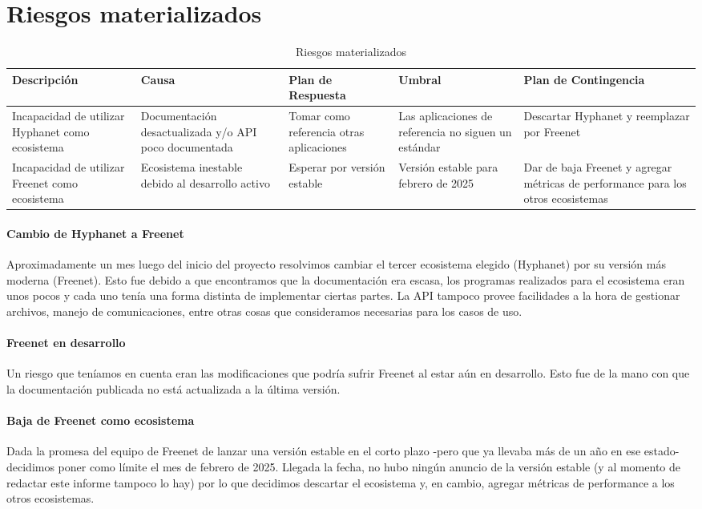 \section{Riesgos materializados}

\setlength\tabcolsep{3pt}
\begin{table}[!htbp]
    \centering
    \begin{tabular}{*{5}{|p{80pt}}|}
    \hline
    \textbf{Descripción} & \textbf{Causa} & \textbf{Plan \break de \break Respuesta} & \textbf{Umbral} & \textbf{Plan \break de \break Contingencia} \\
    \hline\hline
    Incapacidad de utilizar Hyphanet como ecosistema & Documentación desactualizada y/o API poco documentada & Tomar como referencia otras aplicaciones & Las aplicaciones de referencia no siguen un estándar & Descartar Hyphanet y reemplazar por Freenet \\
    \hline
    Incapacidad de utilizar Freenet como ecosistema & Ecosistema inestable debido al desarrollo activo & Esperar por versión estable & Versión estable para febrero de 2025 & Dar de baja Freenet y agregar métricas de performance para los otros ecosistemas \\
    \hline
    \end{tabular}
    \caption{Riesgos materializados}
\end{table}

\paragraph{Cambio de Hyphanet a Freenet}
Aproximadamente un mes luego del inicio del proyecto resolvimos cambiar el tercer ecosistema elegido (Hyphanet) por su versión más moderna (Freenet). Esto fue debido a que encontramos que la documentación era escasa, los programas realizados para el ecosistema eran unos pocos y cada uno tenía una forma distinta de implementar ciertas partes. La API tampoco provee facilidades a la hora de gestionar archivos, manejo de comunicaciones, entre otras cosas que consideramos necesarias para los casos de uso.

\paragraph{Freenet en desarrollo}
Un riesgo que teníamos en cuenta eran las modificaciones que podría sufrir Freenet al estar aún en desarrollo. Esto fue de la mano con que la documentación publicada no está actualizada a la última versión.

\paragraph{Baja de Freenet como ecosistema}
Dada la promesa del equipo de Freenet de lanzar una versión estable en el corto plazo -pero que ya llevaba más de un año en ese estado- decidimos poner como límite el mes de febrero de 2025. Llegada la fecha, no hubo ningún anuncio de la versión estable (y al momento de redactar este informe tampoco lo hay) por lo que decidimos descartar el ecosistema y, en cambio, agregar métricas de performance a los otros ecosistemas.
